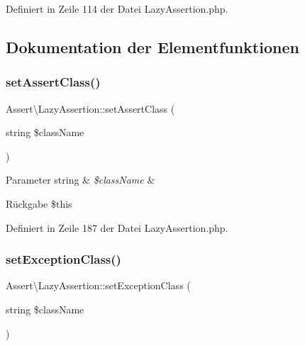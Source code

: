 Definiert in Zeile 114 der Datei Lazy\+Assertion.\+php.



\subsection{Dokumentation der Elementfunktionen}
\mbox{\label{class_assert_1_1_lazy_assertion_a1bc5f53e1ceee872b466d61ded612cf1}} 
\subsubsection{\texorpdfstring{set\+Assert\+Class()}{setAssertClass()}}
{\footnotesize\ttfamily Assert\textbackslash{}\+Lazy\+Assertion\+::set\+Assert\+Class (\begin{DoxyParamCaption}\item[{string}]{\$class\+Name }\end{DoxyParamCaption})}


\begin{DoxyParams}[1]{Parameter}
string & {\em \$class\+Name} & \\
\hline
\end{DoxyParams}
\begin{DoxyReturn}{Rückgabe}
\$this 
\end{DoxyReturn}


Definiert in Zeile 187 der Datei Lazy\+Assertion.\+php.

\mbox{\label{class_assert_1_1_lazy_assertion_ad7b5feb2726c5b664d555dcf2cfc38e5}} 
\subsubsection{\texorpdfstring{set\+Exception\+Class()}{setExceptionClass()}}
{\footnotesize\ttfamily Assert\textbackslash{}\+Lazy\+Assertion\+::set\+Exception\+Class (\begin{DoxyParamCaption}\item[{string}]{\$class\+Name }\end{DoxyParamCaption})}


